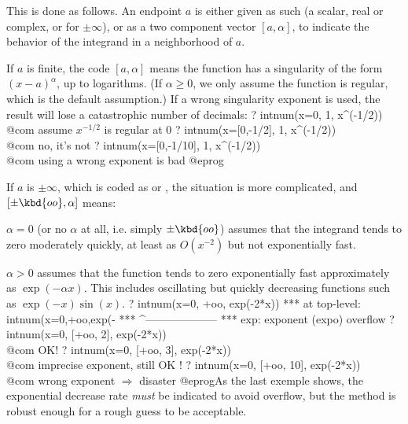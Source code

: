 This is done as follows. An endpoint $a$ is either given as such (a scalar,
real or complex,  or  for $\pm\infty$), or as a two
component vector $[a,\alpha]$, to indicate the behavior of the integrand in a
neighborhood of $a$.

If $a$ is finite, the code $[a,\alpha]$ means the function has a
singularity of the form $(x-a)^{\alpha}$, up to logarithms. (If $\alpha \ge
0$, we only assume the function is regular, which is the default assumption.)
If a wrong singularity exponent is used, the result will lose a catastrophic
number of decimals:
\bprog
? intnum(x=0, 1, x^(-1/2))         \\@com assume $x^{-1/2}$ is regular at 0
? intnum(x=[0,-1/2], 1, x^(-1/2))  \\@com no, it's not
? intnum(x=[0,-1/10], 1, x^(-1/2)) \\@com using a wrong exponent is bad
@eprog

If $a$ is $\pm\infty$, which is coded as  or ,
the situation is more complicated, and $[\pm\kbd{oo},\alpha]$ means:

\item $\alpha=0$ (or no $\alpha$ at all, i.e. simply $\pm\kbd{oo}$)
assumes that the integrand tends to zero moderately quickly, at least as
$O(x^{-2})$ but not exponentially fast.

\item $\alpha>0$ assumes that the function tends to zero exponentially fast
approximately as $\exp(-\alpha x)$. This includes oscillating but quickly
decreasing functions such as $\exp(-x)\sin(x)$.
\bprog
? intnum(x=0, +oo, exp(-2*x))
  ***   at top-level: intnum(x=0,+oo,exp(-
  ***                 ^--------------------
  *** exp: exponent (expo) overflow
? intnum(x=0, [+oo, 2], exp(-2*x))  \\@com OK!
? intnum(x=0, [+oo, 3], exp(-2*x))  \\@com imprecise exponent, still OK !
? intnum(x=0, [+oo, 10], exp(-2*x)) \\@com wrong exponent $\Rightarrow$ disaster
@eprog\noindent As the last exemple shows, the exponential decrease rate
\emph{must} be indicated to avoid overflow, but the method is robust enough
for a rough guess to be acceptable.

